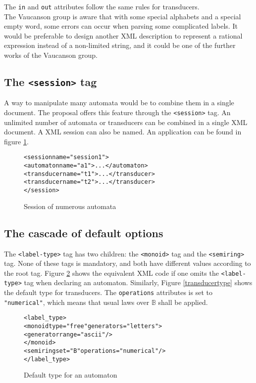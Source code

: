 \documentclass[a4paper]{article}
\newcommand{\Vauc}{{\sc Vaucanson}\xspace}
\def\typetag{\texttt{<label-type>}}
\def\sessiontag{\texttt{<session>}}
\def\monoidtag{\texttt{<monoid>}}
\def\semiringtag{\texttt{<semiring>}}
\begin{document}
The \verb|in| and \verb|out| attributes follow the same rules for transducers.\\
The \Vauc group is aware that with some special alphabets and a special empty
word, some errors can occur when parsing some complicated labels.
It would be preferable to design another XML description to represent a rational
expression instead of a non-limited string, and it could be one of the further
works of the \Vauc{} group.

\subsection{The \sessiontag{} tag}

A way to manipulate many automata would be to combine them in
a single document. The proposal offers this feature through the
\sessiontag{} tag. An unlimited number of automata or transducers
can be combined in a single XML document. A XML session can also be named.
An application can be found in figure \ref{session1}.

{\small

\begin{figure}[h]
  \begin{center}
\begin{alltt}
<session name="session1">
  <automaton name="a1">...</automaton>
  <transducer name="t1">...</transducer>
  <transducer name="t2">...</transducer>
</session>
\end{alltt}

\caption{Session of numerous automata}
\label{session1}
  \end{center}
\end{figure}
}

\subsection{The cascade of default options}

The \typetag{} tag has two children: the \monoidtag{} tag and
the \semiringtag{} tag. None of these tags is mandatory, and both have
different values according to the root tag. Figure
\ref{automatontype} shows the equivalent XML code if one omits the
\typetag{} tag when declaring an automaton. Similarly,
Figure \ref{transducertype} shows the default type for transducers.
The \texttt{operations} attributes is set to \verb|"numerical"|,
which means that usual laws over $\mathbb{B}$ shall be applied.

\begin{figure}[h]
  \begin{center}
\begin{alltt}
<label_type>
  <monoid type="free" generators="letters">
     <generator range="ascii"/>
  </monoid>
  <semiring set="B" operations="numerical"/>
</label_type>
\end{alltt}

\caption{Default type for an automaton}
\label{automatontype}
  \end{center}
\end{figure}
\end{document}
